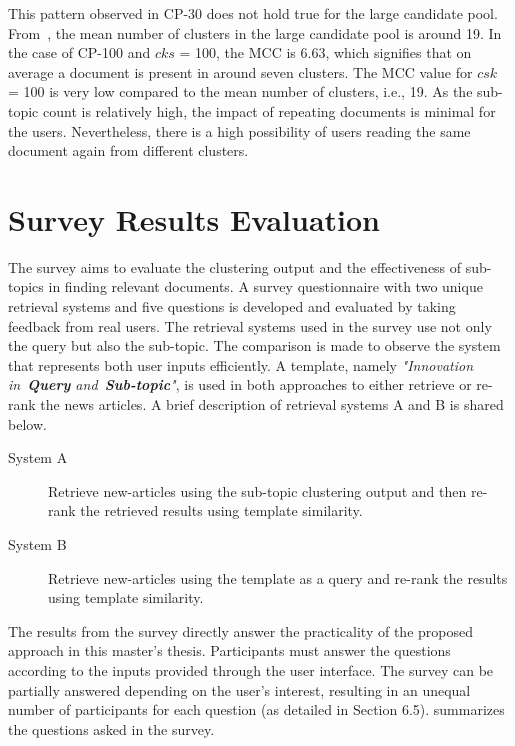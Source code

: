This pattern observed in CP-30 does not hold true for the large candidate pool. From~, the mean number of clusters in the large candidate pool is around 19. In the case of CP-100 and $cks$ = 100, the \ac{MCC} is 6.63, which signifies that on average a document is present in around seven clusters. The \ac{MCC} value for $csk$ = 100 is very low compared to the mean number of clusters, i.e., 19. As the sub-topic count is relatively high, the impact of repeating documents is minimal for the users. Nevertheless, there is a high possibility of users reading the same document again from different clusters.



\section{Survey Results Evaluation}

The survey aims to evaluate the clustering output and the effectiveness of sub-topics in finding relevant documents. A survey questionnaire with two unique retrieval systems and five questions is developed and evaluated by taking feedback from real users. The retrieval systems used in the survey use not only the query but also the sub-topic. The comparison is made to observe the system that represents both user inputs efficiently. A template, namely \textit{"Innovation in~\textbf{Query} and~\textbf{Sub-topic}"}, is used in both approaches to either retrieve or re-rank the news articles. A brief description of retrieval systems A and B is shared below.

\begin{description}
	\item[System A] Retrieve new-articles using the sub-topic clustering output and then re-rank the retrieved results using template similarity.
	
	\item[System B] Retrieve new-articles using the template as a query and re-rank the results using template similarity.
\end{description}

The results from the survey directly answer the practicality of the proposed approach in this master's thesis. Participants must answer the questions according to the inputs provided through the user interface. The survey can be partially answered depending on the user's interest, resulting in an unequal number of participants for each question (as detailed in Section 6.5).  summarizes the questions asked in the survey.


